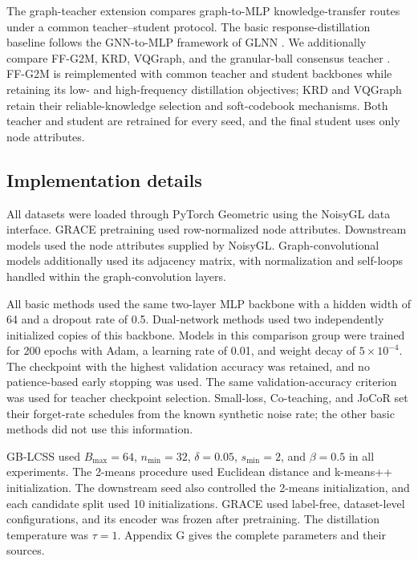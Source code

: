 \documentclass[preprint,12pt]{elsarticle}
\begin{document}
The graph-teacher extension compares graph-to-MLP knowledge-transfer routes under a common teacher--student protocol. The basic response-distillation baseline follows the GNN-to-MLP framework of GLNN \cite{ref3}. We additionally compare FF-G2M, KRD, VQGraph, and the granular-ball consensus teacher \cite{ref6,ref7,ref26}. FF-G2M is reimplemented with common teacher and student backbones while retaining its low- and high-frequency distillation objectives; KRD and VQGraph retain their reliable-knowledge selection and soft-codebook mechanisms. Both teacher and student are retrained for every seed, and the final student uses only node attributes.

\subsection{Implementation details}\label{sec:4.4}

All datasets were loaded through PyTorch Geometric using the NoisyGL data interface. GRACE pretraining used row-normalized node attributes. Downstream models used the node attributes supplied by NoisyGL. Graph-convolutional models additionally used its adjacency matrix, with normalization and self-loops handled within the graph-convolution layers.

All basic methods used the same two-layer MLP backbone with a hidden width of 64 and a dropout rate of 0.5. Dual-network methods used two independently initialized copies of this backbone. Models in this comparison group were trained for 200 epochs with Adam, a learning rate of 0.01, and weight decay of \(5 \times 10^{- 4}\). The checkpoint with the highest validation accuracy was retained, and no patience-based early stopping was used. The same validation-accuracy criterion was used for teacher checkpoint selection. Small-loss, Co-teaching, and JoCoR set their forget-rate schedules from the known synthetic noise rate; the other basic methods did not use this information.

GB-LCSS used \(B_{\max} = 64\), \(n_{\min} = 32\), \(\delta = 0.05\), \(s_{\min} = 2\), and \(\beta = 0.5\) in all experiments. The 2-means procedure used Euclidean distance and k-means++ initialization. The downstream seed also controlled the 2-means initialization, and each candidate split used 10 initializations. GRACE used label-free, dataset-level configurations, and its encoder was frozen after pretraining. The distillation temperature was \(\tau = 1\). Appendix G gives the complete parameters and their sources.
\end{document}
